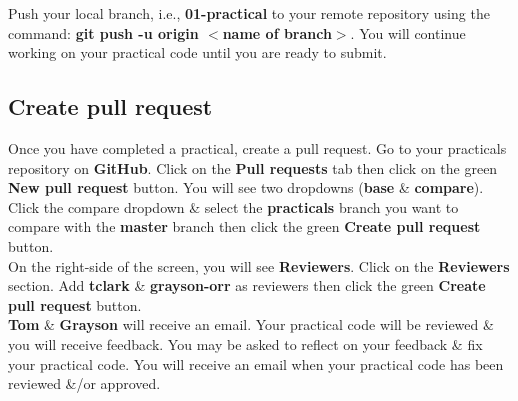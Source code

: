 \documentclass{article}
\begin{document}
Push your local branch, i.e., \textbf{01-practical} to your remote repository using the command: \textbf{git push -u origin $<$name of branch$>$}. You will continue working on your practical code until you are ready to submit.

\subsection*{Create pull request} 

Once you have completed a practical, create a pull request. Go to your practicals repository on \textbf{GitHub}. Click on the \textbf{Pull requests} tab then click on the green \textbf{New pull request} button. You will see two dropdowns (\textbf{base} \& \textbf{compare}). Click the compare dropdown \& select the \textbf{practicals} branch you want to compare with the \textbf{master} branch then click the green \textbf{Create pull request} button. \\

On the right-side of the screen, you will see \textbf{Reviewers}. Click on the \textbf{Reviewers} section. Add \textbf{tclark} \& \textbf{grayson-orr} as reviewers then click the green \textbf{Create pull request} button. \\

\textbf{Tom} \& \textbf{Grayson} will receive an email. Your practical code will be reviewed \& you will receive feedback. You may be asked to reflect on your feedback \& fix your practical code. You will receive an email when your practical code has been reviewed \&/or approved.
 
\end{document}

